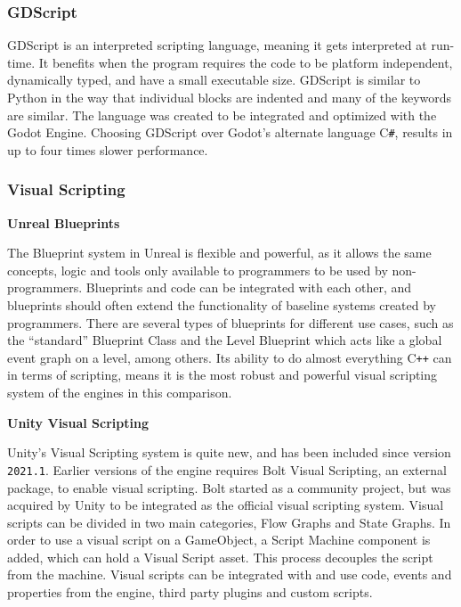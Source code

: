 \subsubsection{GDScript} \label{subsubsec:gds}
GDScript is an interpreted scripting language, meaning it gets interpreted at run-time. It benefits when the program requires the code to be platform independent, dynamically typed, and have a small executable size. GDScript is similar to Python in the way that individual blocks are indented and many of the keywords are similar. The language was created to be integrated and optimized with the Godot Engine. \cite{gdscript_basic} Choosing GDScript over Godot's alternate language C\texttt{\#}, results in up to four times slower performance. \cite{godot_engine_c_sharp} 



\subsubsection{Visual Scripting}

\textbf{Unreal Blueprints} \label{unreal:blueprints}

The Blueprint system in Unreal is flexible and powerful, as it allows the same concepts, logic and tools only available to programmers to be used by non-programmers. Blueprints and code can be integrated with each other, and blueprints should often extend the functionality of baseline systems created by programmers. There are several types of blueprints for different use cases, such as the “standard” Blueprint Class and the Level Blueprint which acts like a global event graph on a level, among others. \cite{unreal_blueprint_overview} Its ability to do almost everything C\texttt{++} can in terms of scripting, means it is the most robust and powerful visual scripting system of the engines in this comparison.

\textbf{Unity Visual Scripting} \label{unity:visual_scripting}


Unity's Visual Scripting system is quite new, and has been included since version \texttt{2021.1}. Earlier versions of the engine requires Bolt Visual Scripting, an external package, to enable visual scripting. Bolt started as a community project, but was acquired by Unity to be integrated as the official visual scripting system. \cite{unity_aquire_bolt} Visual scripts can be divided in two main categories, Flow Graphs and State Graphs. \cite{unity_visual_scripting} In order to use a visual script on a GameObject, a Script Machine component is added, which can hold a Visual Script asset. This process decouples the script from the machine. Visual scripts can be integrated with and use code, events and properties from the engine, third party plugins and custom scripts. \cite{unity_visual_scripting_docs}


